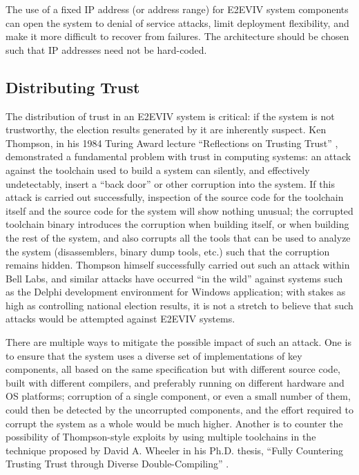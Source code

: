 The use of a fixed IP address (or address range) for E2EVIV system
components can open the system to denial of service attacks, limit
deployment flexibility, and make it more difficult to recover from
failures. The architecture should be chosen such that IP addresses
need not be hard-coded. 




\subsection{Distributing Trust}

The distribution of trust in an E2EVIV system is critical: if the
system is not trustworthy, the election results generated by it are
inherently suspect. Ken Thompson, in his 1984 Turing Award lecture
``Reflections on Trusting Trust'' \cite{Thompson84}, demonstrated a
fundamental problem with trust in computing systems: an attack against
the toolchain used to build a system can silently, and effectively
undetectably, insert a ``back door'' or other corruption into the
system. If this attack is carried out successfully, inspection of the
source code for the toolchain itself and the source code for the
system will show nothing unusual; the corrupted toolchain binary
introduces the corruption when building itself, or when building the
rest of the system, and also corrupts all the tools that can be used
to analyze the system (disassemblers, binary dump tools, etc.) such
that the corruption remains hidden. Thompson himself successfully
carried out such an attack within Bell Labs, and similar attacks have
occurred ``in the wild'' against systems such as the Delphi
development environment for Windows application; with stakes as high
as controlling national election results, it is not a stretch to
believe that such attacks would be attempted against E2EVIV systems.

There are multiple ways to mitigate the possible impact of such an
attack. One is to ensure that the system uses a diverse set of
implementations of key components, all based on the same specification
but with different source code, built with different compilers, and
preferably running on different hardware and OS platforms; corruption
of a single component, or even a small number of them, could then be
detected by the uncorrupted components, and the effort required to
corrupt the system as a whole would be much higher. Another is to
counter the possibility of Thompson-style exploits by using multiple
toolchains in the technique proposed by David A. Wheeler in his
Ph.D. thesis, ``Fully Countering Trusting Trust through Diverse
Double-Compiling'' \cite{Wheeler09}.

